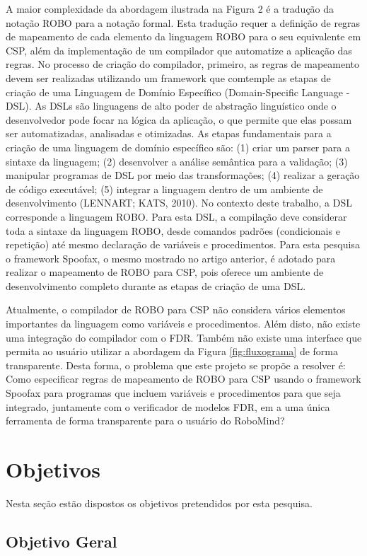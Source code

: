 A maior complexidade da abordagem ilustrada na Figura 2 é a tradução da notação ROBO para a notação formal. Esta tradução requer a definição de regras de mapeamento de cada elemento da linguagem ROBO para o seu equivalente em CSP, além da implementação de um compilador que automatize a aplicação das regras. No processo de criação do compilador, primeiro, as regras de mapeamento devem ser realizadas utilizando um framework que comtemple as etapas de criação de uma Linguagem de Domínio Específico (Domain-Specific Language - DSL). As DSLs são linguagens de alto poder de abstração linguístico onde o desenvolvedor pode focar na lógica da aplicação, o que permite que elas possam ser automatizadas, analisadas e otimizadas. As etapas fundamentais para a criação de uma linguagem de domínio específico são: (1) criar um parser para a sintaxe da linguagem; (2) desenvolver a análise semântica para a validação; (3) manipular programas de DSL por meio das transformações; (4) realizar a geração de código executável; (5) integrar a linguagem dentro de um ambiente de desenvolvimento (LENNART; KATS, 2010). No contexto deste trabalho, a DSL corresponde a linguagem ROBO. Para esta DSL, a compilação deve considerar toda a sintaxe da linguagem ROBO, desde comandos padrões (condicionais e repetição) até mesmo declaração de variáveis e procedimentos. Para esta pesquisa o framework Spoofax, o mesmo mostrado no artigo anterior, é adotado para realizar o mapeamento de ROBO para CSP, pois oferece um ambiente de desenvolvimento completo durante as etapas de criação de uma DSL.

Atualmente, o compilador de ROBO para CSP não considera vários elementos importantes da linguagem como variáveis e procedimentos. Além disto, não existe uma integração do compilador com o FDR. Também não existe uma interface que permita ao usuário utilizar a abordagem da Figura \ref{fig:fluxograma} de forma transparente. Desta forma, o problema que este projeto se propõe a resolver é:
Como especificar regras de mapeamento de ROBO para CSP usando o framework Spoofax para programas que incluem variáveis e procedimentos para que seja integrado, juntamente com o verificador de modelos FDR, em a uma única ferramenta de forma transparente para o usuário do RoboMind?

\section{Objetivos}
Nesta seção estão dispostos os objetivos pretendidos por esta pesquisa.
\subsection{Objetivo Geral}

